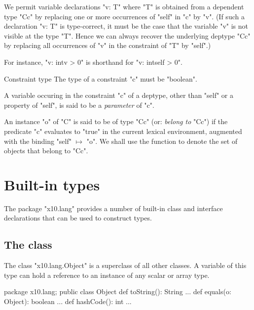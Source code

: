 We permit variable declarations \xcd"v: T" where \xcd"T" is obtained
from a dependent type \xcd"C{c}" by replacing one or more occurrences
of \xcd"self" in \xcd"c" by \xcd"v". (If such a declaration \xcd"v: T"
is type-correct, it must be the case that the variable \xcd"v" is not
visible at the type \xcd"T". Hence we can always recover the
underlying deptype \xcd"C{c}" by replacing all occurrences of \xcd"v"
in the constraint of \xcd"T" by \xcd"self".)

For instance, \xcd"v: int{v > 0}" is shorthand for \xcd"v: int{self > 0}".

\begin{staticrule}{Constraint type}
  The type of a constraint \xcd"c" must be \xcd"boolean".  
\end{staticrule}

A variable occuring in the constraint \xcd"c" of a deptype, other than
\xcd"self" or a property of \xcd"self", is said to be a {\em
parameter} of \xcd"c".\label{DepType:Parameter} 

An instance \xcd"o" of \xcd"C" is said to be of type \xcd"C{c}"
(or: {\em belong to}
\xcd"C{c}") if the predicate \xcd"c" evaluates to \xcd"true" in the current lexical
environment, augmented with the binding \xcd"self" $\mapsto$ \xcd"o". We shall
use the function  to denote the set of
objects that belong to \xcd"C{c}". 



\section{Built-in types}

The package \xcd"x10.lang" provides a number of built-in class and
interface declarations that can be used to construct types.

\subsection{The class }\label{Object}
The class \xcd"x10.lang.Object" is a superclass of all other classes.
A variable of this type can hold a reference to an instance of any
scalar or array type.

\begin{xten}
package x10.lang;
public class Object {
  def toString(): String {...}
  def equals(o: Object): boolean {...}
  def hashCode(): int {...}
}
\end{xten}

